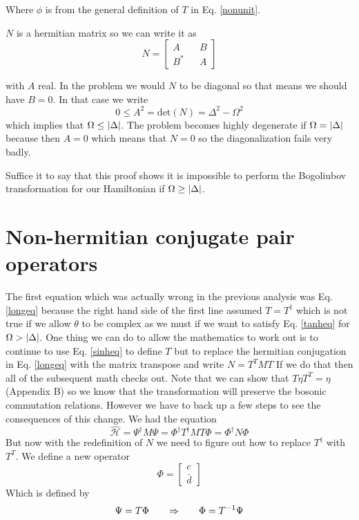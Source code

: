 \documentclass[12pt]{article}
\begin{document}
Where $\phi$ is from the general definition of $T$ in Eq. \ref{nonunit}.

$N$ is a hermitian matrix so we can write it as 
\begin{equation}
N = \begin{bmatrix}
A && B\\
B^* && A
\end{bmatrix}
\end{equation}

with $A$ real. In the problem we would $N$ to be diagonal so that means we should have $B=0$. In that case we write
\begin{equation}
0 \le A^2 = \text{det}(N) = \Delta^2 -\Omega^2
\end{equation}
which implies that $\Omega \le \abs{\Delta}$. The problem becomes highly degenerate if $\Omega = \abs{\Delta}$ because then $A=0$ which means that $N=0$ so the diagonalization fails very badly.

Suffice it to say that this proof shows it is impossible to perform the Bogoliubov transformation for our Hamiltonian if $\Omega \ge \abs{\Delta}$.

\section{Non-hermitian conjugate pair operators}
The first equation which was actually wrong in the previous analysis was Eq. \ref{longeq} because the right hand side of the first line assumed $T = T^{\dag}$ which is not true if we allow $\theta$ to be complex as we must if we want to satisfy Eq. \ref{tanheq} for $\Omega > \abs{\Delta}$. One thing we can do to allow the mathematics to work out is to continue to use Eq. \ref{sinheq} to define $T$ but to replace the hermitian conjugation in Eq. \ref{longeq} with the matrix transpose and write
$N = T^{T}MT$
If we do that then all of the subsequent math checks out. 
Note that we can show that $T \eta T^T = \eta$ (Appendix B) so we know that the transformation will preserve the bosonic commutation relations.
However we have to back up a few steps to see the consequences of this change. We had the equation
\begin{equation}
\hat{\mathcal{H}} = \Psi^{\dag}M\Psi =  \Phi^{\dagger} T^{\dag}MT \Phi = \Phi^{\dag}N \Phi
\end{equation}
But now with the redefinition of $N$ we need to figure out how to replace $T^{\dag}$ with $T^T$. We define a new operator
\begin{equation}
\Phi = 
\begin{bmatrix}
c\\\bar{d}
\end{bmatrix}
\end{equation}
Which is defined by
\begin{equation}
\label{phieq1}
\Psi = T \Phi \hspace{.25in} \Rightarrow \hspace{.25in} \Phi = T^{-1}\Psi
\end{equation}
\end{document}

